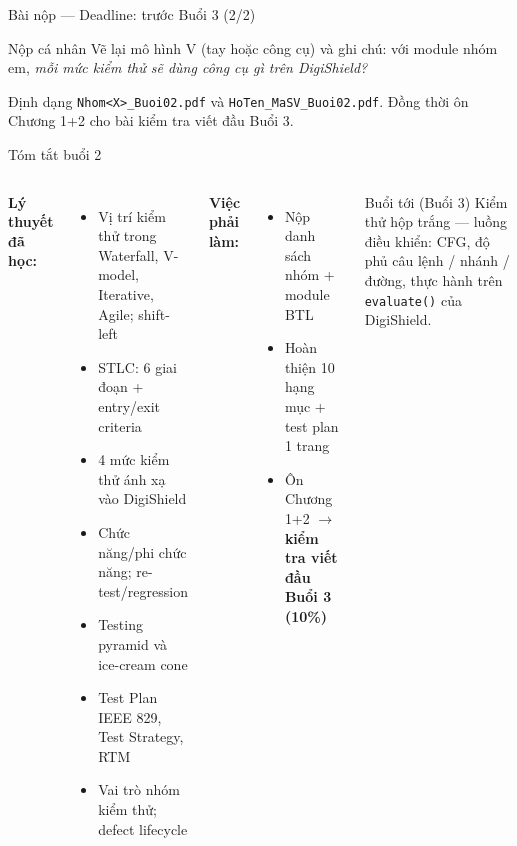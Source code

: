 \documentclass[aspectratio=169,12pt]{beamer}
\begin{document}
\begin{frame}{Bài nộp --- Deadline: trước Buổi 3 (2/2)}
  \begin{block}{Nộp cá nhân}
    Vẽ lại mô hình V (tay hoặc công cụ) và ghi chú: với module nhóm em,
    \textit{mỗi mức kiểm thử sẽ dùng công cụ gì trên DigiShield?}
  \end{block}

  \vspace{0.3em}
  \begin{alertblock}{Định dạng}
    \texttt{Nhom<X>\_Buoi02.pdf} và \texttt{HoTen\_MaSV\_Buoi02.pdf}.
    Đồng thời ôn Chương 1+2 cho bài kiểm tra viết đầu Buổi 3.
  \end{alertblock}
\end{frame}

\begin{frame}{Tóm tắt buổi 2}
  \begin{columns}[T]
    {\small\textbf{Lý thuyết đã học:}}
    \begin{itemize}
      \item Vị trí kiểm thử trong Waterfall, V-model, Iterative, Agile; shift-left
      \item STLC: 6 giai đoạn + entry/exit criteria
      \item 4 mức kiểm thử ánh xạ vào DigiShield
      \item Chức năng/phi chức năng; re-test/regression
      \item Testing pyramid và ice-cream cone
      \item Test Plan IEEE 829, Test Strategy, RTM
      \item Vai trò nhóm kiểm thử; defect lifecycle
    \end{itemize}

    {\small\textbf{Việc phải làm:}}
    \begin{itemize}
      \item Nộp danh sách nhóm + module BTL
      \item Hoàn thiện 10 hạng mục + test plan 1 trang
      \item Ôn Chương 1+2 $\to$ \textbf{kiểm tra viết đầu Buổi 3 (10\%)}
    \end{itemize}

    \vspace{0.3em}
    \begin{block}{Buổi tới (Buổi 3)}
      \footnotesize Kiểm thử hộp trắng --- luồng điều khiển: CFG, độ phủ câu lệnh /
      nhánh / đường, thực hành trên \texttt{evaluate()} của DigiShield.
    \end{block}
  \end{columns}
\end{frame}
\end{document}
